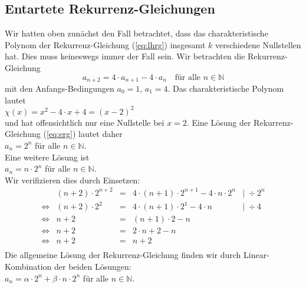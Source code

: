 \subsection{Entartete Rekurrenz-Gleichungen}
Wir hatten oben zun\"{a}chst den Fall betrachtet, dass das charakteristische Polynom der
Rekurrenz-Gleichung (\ref{eq:lhrg}) insgesamt $k$ verschiedene Nullstellen hat.   Dies muss
keineswegs immer der Fall sein.  Wir betrachten die Rekurrenz-Gleichung 
\begin{equation}
  \label{eq:erg}
  a_{n+2} = 4 \cdot a_{n+1} - 4 \cdot a_n \quad \mbox{f\"{u}r alle $n \in \mathbb{N}$} 
\end{equation}
 mit den Anfangs-Bedingungen $a_0 = 1$, $a_1 = 4$.  Das charakteristische Polynom lautet \\[0.2cm]
\hspace*{1.3cm} $\chi(x) = x^2 - 4 \cdot x + 4 = (x - 2)^2$ \\[0.2cm]
und hat offensichtlich nur eine Nullstelle bei $x = 2$.   Eine L\"{o}sung der
Rekurrenz-Gleichung (\ref{eq:erg}) lautet daher \\[0.2cm]
\hspace*{1.3cm} $a_n = 2^n$ \quad f\"{u}r alle $n \in \mathbb{N}$. \\[0.2cm]
Eine weitere L\"{o}sung ist \\[0.2cm]
\hspace*{1.3cm} $a_n = n \cdot 2^n$ \quad f\"{u}r alle $n \in \mathbb{N}$.  \\[0.2cm]
Wir verifizieren dies durch Einsetzen: 
\[
\begin{array}{llcll}
 & (n+2) \cdot 2^{n+2} & = & 4 \cdot (n+1) \cdot 2^{n+1} - 4 \cdot n \cdot 2^n & \mid\; \div 2^n \\
\Leftrightarrow & 
   (n+2) \cdot 2^{2} & = & 4 \cdot (n+1) \cdot 2^{1} - 4 \cdot n  &  \mid\; \div 4 \\
\Leftrightarrow & n + 2 & = & (n + 1) \cdot 2 -  n  &  \\
\Leftrightarrow & n + 2 & = & 2 \cdot n + 2 -  n   \\
\Leftrightarrow & n + 2 & = & n + 2    \\
\end{array}
\]
Die allgemeine L\"{o}sung der Rekurrenz-Gleichung finden wir durch Linear-Kombination der
beiden L\"{o}sungen: \\[0.2cm]
\hspace*{1.3cm} $a_n = \alpha \cdot 2^n + \beta \cdot n \cdot 2^n$ \quad f\"{u}r alle $n \in \mathbb{N}$. \\[0.2cm]

